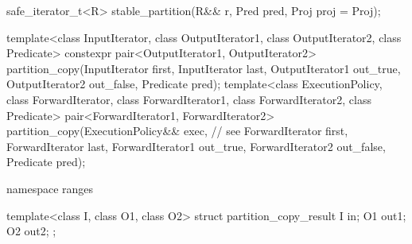 \begin{addedblock}
\begin{codeblock}
{      safe_iterator_t<R> stable_partition(R&& r, Pred pred, Proj proj = Proj{});
  }
\end{codeblock}\end{addedblock}\begin{codeblock}
  template<class InputIterator, class OutputIterator1,
           class OutputIterator2, class Predicate>
    constexpr pair<OutputIterator1, OutputIterator2>
      partition_copy(InputIterator first, InputIterator last,
                     OutputIterator1 out_true, OutputIterator2 out_false,
                     Predicate pred);
  template<class ExecutionPolicy, class ForwardIterator, class ForwardIterator1,
           class ForwardIterator2, class Predicate>
    pair<ForwardIterator1, ForwardIterator2>
      partition_copy(ExecutionPolicy&& exec, // see 
                     ForwardIterator first, ForwardIterator last,
                     ForwardIterator1 out_true, ForwardIterator2 out_false,
                     Predicate pred);
\end{codeblock}\begin{addedblock}\begin{codeblock}
  namespace ranges {
    template<class I, class O1, class O2>
    struct partition_copy_result {
      I  in;
      O1 out1;
      O2 out2;
    };

}
\end{codeblock}
\end{addedblock}
